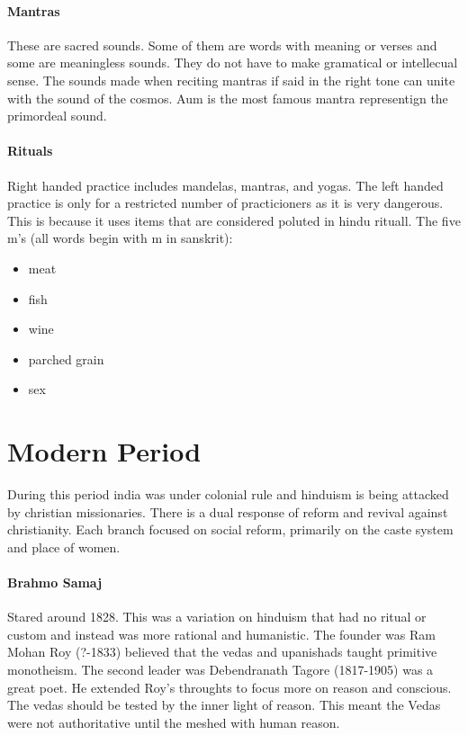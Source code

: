 \documentclass{article}
\begin{document}
\paragraph{Mantras}
\label{par:mantras}
These are sacred sounds. Some of them are words with meaning or verses and some are meaningless sounds. They do not have to make gramatical or intellecual sense. The sounds made when reciting mantras if said in the right tone can unite with the sound of the cosmos. Aum is the most famous mantra representign the primordeal sound.

\paragraph{Rituals}
\label{par:rituals}
Right handed practice includes mandelas, mantras, and yogas. The left handed practice is only for a restricted number of practicioners as it is very dangerous. This is because it uses items that are considered poluted in hindu rituall. The five m's (all words begin with m in sanskrit):
\begin{itemize}
	\item meat
	\item fish
	\item wine
	\item parched grain
	\item sex
\end{itemize}

\section*{Modern Period}
\label{sec:modern_period}
During this period india was under colonial rule and hinduism is being attacked by christian missionaries. There is a dual response of reform and revival against christianity. Each branch focused on social reform, primarily on the caste system and place of women.

\paragraph{Brahmo Samaj}
\label{par:brahmo_samaj}
Stared around 1828. This was a variation on hinduism that had no ritual or custom and instead was more rational and humanistic. The founder was Ram Mohan Roy (?-1833) believed that the vedas and upanishads taught primitive monotheism. The second leader was Debendranath Tagore (1817-1905) was a great poet. He extended Roy's throughts to focus more on reason and conscious. The vedas should be tested by the inner light of reason. This meant the Vedas were not authoritative until the meshed with human reason.
\end{document}
